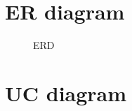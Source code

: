 \documentclass[11pt, a4paper]{article}
\begin{document}
\section{ER diagram}

\begin{figure}[ht]
	\begin{center}
	\caption{ERD}
	\end{center}
\end{figure}

\section{UC diagram}
\end{document}
